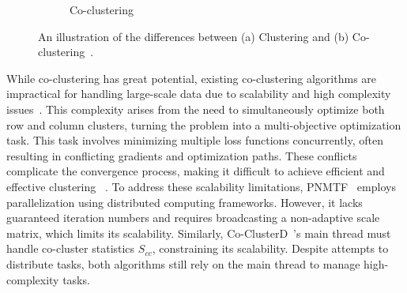 \documentclass[journal]{IEEEtran}
\renewcommand{\cite}[1]{~\autocite{#1}}
\begin{document}
\begin{figure}[t]
\begin{subfigure}[b]{0.22\textwidth}
    \caption{Co-clustering}
    \label{fig:cocluster}
  \end{subfigure}
  \caption{An illustration of the differences between (a) Clustering and (b) Co-clustering\cite{yan2017CoclusteringMultidimensionalBig}.}
  \label{fig:cocomparison}
\end{figure}

While co-clustering has great potential, existing co-clustering algorithms are impractical for handling large-scale data due to scalability and high complexity issues\cite{cheng2015CoClusterDDistributedFramework}. This complexity arises from the need to simultaneously optimize both row and column clusters,  turning the problem into a multi-objective optimization task. This task involves minimizing multiple loss functions concurrently, often resulting in conflicting gradients and optimization paths. These conflicts complicate the convergence process, making it difficult to achieve efficient and effective clustering \cite{coello2007EvolutionaryAlgorithmsSolving}. To address these scalability limitations, PNMTF\cite{chen2023ParallelNonNegativeMatrix} employs parallelization using distributed computing frameworks. However, it lacks guaranteed iteration numbers and requires broadcasting a non-adaptive scale matrix, which limits its scalability. Similarly, Co-ClusterD\cite{cheng2015CoClusterDDistributedFramework}'s main thread must handle co-cluster statistics \(S_{cc}\), constraining its scalability. Despite attempts to distribute tasks, both algorithms still rely on the main thread to manage high-complexity tasks.

\end{document}

